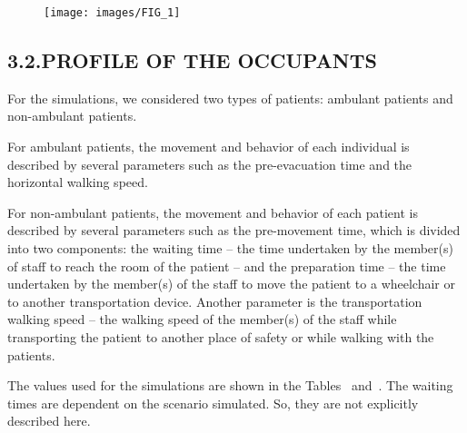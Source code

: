 \documentclass{style/llncs}
\begin{document}
\begin{figure}[tbp]%
\begin{mdcenter}%

\noindent{}\texttt{[image: images/FIG\_1]}{}%

\mdhr{}%

\noindent{}%
\end{mdcenter}\label{fig-layout}%
\end{figure}%

\subsection{3.2.\hspace*{0.5em}PROFILE OF THE OCCUPANTS}\label{sec-profile-of-the-occupants}%

\noindent{}For the simulations, we considered two types of patients: ambulant
patients and non-ambulant patients.%

For ambulant patients, the movement and behavior of each individual is
described by several parameters such as the pre-evacuation time and the
horizontal walking speed.%

For non-ambulant patients, the movement and behavior of each patient is
described by several parameters such as the pre-movement time, which is
divided into two components: the waiting time – the time undertaken by
the member(s) of staff to reach the room of the patient – and the
preparation time – the time undertaken by the member(s) of the staff to
move the patient to a wheelchair or to another transportation device.
Another parameter is the transportation walking speed – the walking speed
of the member(s) of the staff while transporting the patient to another
place of safety or while walking with the patients.%

The values used for the simulations are shown in the
Tables~ and~. The waiting times are
dependent on the scenario simulated. So, they are not explicitly
described here.%
\end{document}
